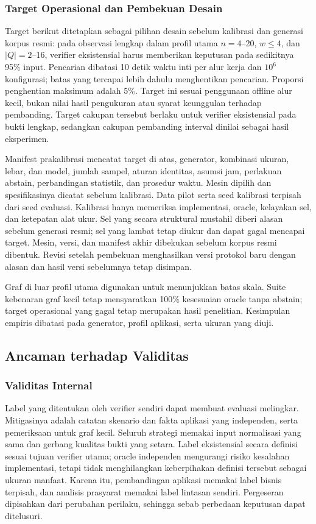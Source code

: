 \subsubsection{Target Operasional dan Pembekuan Desain}
Target berikut ditetapkan sebagai pilihan desain sebelum kalibrasi dan generasi korpus resmi: pada observasi lengkap dalam profil utama $n=4$--20, $w\leq4$, dan $|Q|=2$--16, verifier eksistensial harus memberikan keputusan pada sedikitnya 95\% input. Pencarian dibatasi 10 detik waktu inti per alur kerja dan $10^6$ konfigurasi; batas yang tercapai lebih dahulu menghentikan pencarian. Proporsi penghentian maksimum adalah 5\%. Target ini sesuai penggunaan offline alur kecil, bukan nilai hasil pengukuran atau syarat keunggulan terhadap pembanding. Target cakupan tersebut berlaku untuk verifier eksistensial pada bukti lengkap, sedangkan cakupan pembanding interval dinilai sebagai hasil eksperimen.

Manifest prakalibrasi mencatat target di atas, generator, kombinasi ukuran, lebar, dan model, jumlah sampel, aturan identitas, asumsi jam, perlakuan abstain, perbandingan statistik, dan prosedur waktu. Mesin dipilih dan spesifikasinya dicatat sebelum kalibrasi. Data pilot serta seed kalibrasi terpisah dari seed evaluasi. Kalibrasi hanya memeriksa implementasi, oracle, kelayakan sel, dan ketepatan alat ukur. Sel yang secara struktural mustahil diberi alasan sebelum generasi resmi; sel yang lambat tetap diukur dan dapat gagal mencapai target. Mesin, versi, dan manifest akhir dibekukan sebelum korpus resmi dibentuk. Revisi setelah pembekuan menghasilkan versi protokol baru dengan alasan dan hasil versi sebelumnya tetap disimpan.

Graf di luar profil utama digunakan untuk menunjukkan batas skala. Suite kebenaran graf kecil tetap mensyaratkan 100\% kesesuaian oracle tanpa abstain; target operasional yang gagal tetap merupakan hasil penelitian. Kesimpulan empiris dibatasi pada generator, profil aplikasi, serta ukuran yang diuji.

\subsection{Ancaman terhadap Validitas}
\subsubsection{Validitas Internal}
Label yang ditentukan oleh verifier sendiri dapat membuat evaluasi melingkar. Mitigasinya adalah catatan skenario dan fakta aplikasi yang independen, serta pemeriksaan  untuk graf kecil. Seluruh strategi memakai input normalisasi yang sama dan gerbang kualitas bukti yang setara. Label eksistensial secara definisi sesuai tujuan verifier utama; oracle independen mengurangi risiko kesalahan implementasi, tetapi tidak menghilangkan keberpihakan definisi tersebut sebagai ukuran manfaat. Karena itu, pembandingan aplikasi memakai label bisnis terpisah, dan analisis prasyarat memakai label lintasan sendiri. Pergeseran  dipisahkan dari perubahan perilaku, sehingga sebab perbedaan keputusan dapat ditelusuri.

